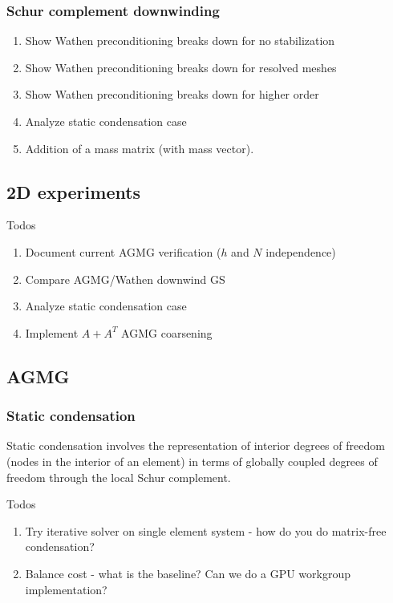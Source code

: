 \documentclass[final,leqno]{siamltex}
\begin{document}
\subsubsection{Schur complement downwinding}

\cite{Cai14}
\begin{enumerate}
\item Show Wathen preconditioning breaks down for no stabilization
\item Show Wathen preconditioning breaks down for resolved meshes
\item Show Wathen preconditioning breaks down for higher order
\item Analyze static condensation case
\item Addition of a mass matrix (with mass vector).  
\end{enumerate}

\subsection{2D experiments}

Todos
\begin{enumerate}
\item Document current AGMG verification ($h$ and $N$ independence)
\item Compare AGMG/Wathen downwind GS
\item Analyze static condensation case
\item Implement $A+A^T$ AGMG coarsening
\end{enumerate}

\subsection{AGMG}

\subsubsection{Static condensation}

Static condensation involves the representation of interior degrees of freedom (nodes in the interior of an element) in terms of globally coupled degrees of freedom through the local Schur complement.  

Todos
\begin{enumerate}
\item Try iterative solver on single element system - how do you do matrix-free condensation?  
\item Balance cost - what is the baseline?  Can we do a GPU workgroup implementation?  
\end{enumerate}




\end{document}
